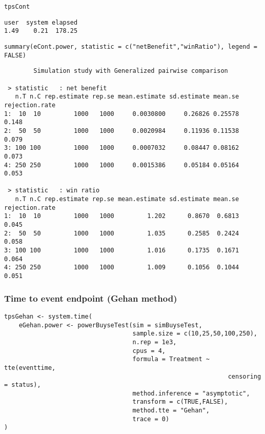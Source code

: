 \documentclass[12pt]{article}
\begin{document}
\lstset{language=r,label= ,caption= ,captionpos=b,numbers=none}
\begin{lstlisting}
tpsCont
\end{lstlisting}

\begin{verbatim}
user  system elapsed 
1.49    0.21  178.25
\end{verbatim}

\lstset{language=r,label= ,caption= ,captionpos=b,numbers=none}
\begin{lstlisting}
summary(eCont.power, statistic = c("netBenefit","winRatio"), legend = FALSE)
\end{lstlisting}

\begin{verbatim}
        Simulation study with Generalized pairwise comparison

 > statistic   : net benefit
   n.T n.C rep.estimate rep.se mean.estimate sd.estimate mean.se rejection.rate
1:  10  10         1000   1000     0.0030800     0.26826 0.25578          0.148
2:  50  50         1000   1000     0.0020984     0.11936 0.11538          0.079
3: 100 100         1000   1000     0.0007032     0.08447 0.08162          0.073
4: 250 250         1000   1000     0.0015386     0.05184 0.05164          0.053

 > statistic   : win ratio
   n.T n.C rep.estimate rep.se mean.estimate sd.estimate mean.se rejection.rate
1:  10  10         1000   1000         1.202      0.8670  0.6813          0.045
2:  50  50         1000   1000         1.035      0.2585  0.2424          0.058
3: 100 100         1000   1000         1.016      0.1735  0.1671          0.064
4: 250 250         1000   1000         1.009      0.1056  0.1044          0.051
\end{verbatim}

\clearpage

\subsubsection{Time to event endpoint (Gehan method)}
\label{sec:orgb75e956}
\lstset{language=r,label= ,caption= ,captionpos=b,numbers=none}
\begin{lstlisting}
tpsGehan <- system.time(
	eGehan.power <- powerBuyseTest(sim = simBuyseTest, 
								   sample.size = c(10,25,50,100,250), 
								   n.rep = 1e3,
								   cpus = 4,
								   formula = Treatment ~ tte(eventtime, 
															 censoring = status), 
								   method.inference = "asymptotic",
								   transform = c(TRUE,FALSE),
								   method.tte = "Gehan",
								   trace = 0)
)
\end{lstlisting}
\end{document}
